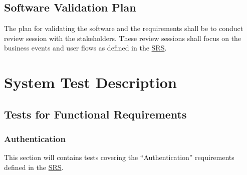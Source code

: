 \documentclass[12pt, titlepage]{article}
\begin{document}
\subsection{Software Validation Plan}

The plan for validating the software and the requirements shall be to conduct review session with
the stakeholders. These review sessions shall focus on the business events and user flows as
defined in the \href{https://github.com/arkinmodi/project-sayyara/blob/main/docs/SRS/SRS.pdf}{SRS}.

\section{System Test Description} \label{System Test Description}

\subsection{Tests for Functional Requirements} \label{Tests for Functional Requirements}



\subsubsection{Authentication}
This section will contains tests covering the ``Authentication'' requirements defined in the
\href{https://github.com/arkinmodi/project-sayyara/blob/main/docs/SRS/SRS.pdf}{SRS}.
\end{document}
